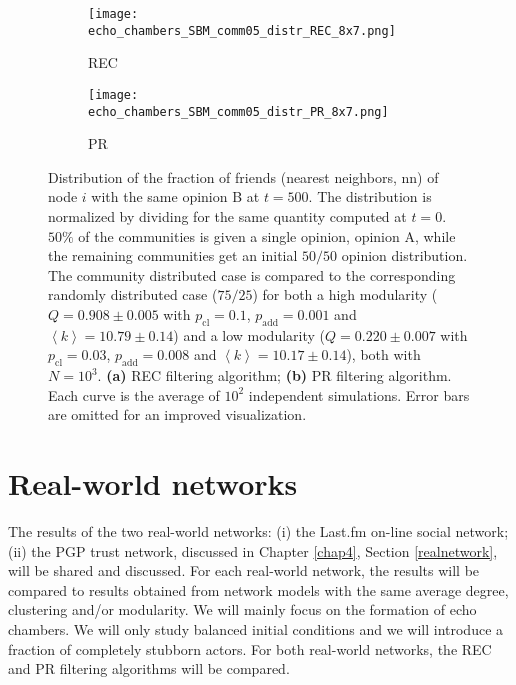 \documentclass[11 pt , letterpaper , twoside , openright]{book}
\begin{document}
\begin{figure}[H]
  \begin{subfigure}[b]{0.49\textwidth}
    \caption{REC}
  	\texttt{[image: echo\_chambers\_SBM\_comm05\_distr\_REC\_8x7.png]}
    \label{rec_comm05_echo}
  \end{subfigure}
  \begin{subfigure}[b]{0.49\textwidth}
    \caption{PR}
  	\texttt{[image: echo\_chambers\_SBM\_comm05\_distr\_PR\_8x7.png]}
    \label{pr_comm05_echo}
  \end{subfigure}
  \captionsetup{format=plain}
  \caption[Distribution of the fraction of friends (nearest neighbors, nn) of node $i$ with the same opinion B at $t = 500$. $50 \%$ of the communities is given a single opinion, opinion A, while the remaining communities get an initial $50/50$ opinion distribution. The community distributed case is compared to the corresponding randomly distributed case ($75/25$) for both a high modularity and a low modularity network. Results for the REC and PR filtering algorithms.]{Distribution of the fraction of friends (nearest neighbors, nn) of node $i$ with the same opinion B at $t = 500$. The distribution is normalized by dividing for the same quantity computed at $t=0$. $50 \%$ of the communities is given a single opinion, opinion A, while the remaining communities get an initial $50/50$ opinion distribution. The community distributed case is compared to the corresponding randomly distributed case ($75/25$) for both a high modularity ($Q = 0.908 \pm 0.005$ with $p_{\text{cl}} = 0.1$, $p_{\text{add}} = 0.001$ and $\left<k\right> = 10.79 \pm 0.14$) and a low modularity ($Q = 0.220 \pm 0.007$ with $p_{\text{cl}} = 0.03$, $p_{\text{add}} = 0.008$ and $\left<k\right> = 10.17 \pm 0.14$), both with $N=10^3$. \textbf{(a)} REC filtering algorithm; \textbf{(b)} PR filtering algorithm. Each curve is the average of $10^2$ independent simulations. Error bars are omitted for an improved visualization.}
\label{echo_05_commOp0_other_50-50}
\end{figure}

\newpage
\section{Real-world networks}

The results of the two real-world networks: (i) the Last.fm on-line social network; (ii) the PGP trust network, discussed in Chapter \ref{chap4}, Section \ref{realnetwork}, will be shared and discussed. For each real-world network, the results will be compared to results obtained from network models with the same average degree, clustering and/or modularity. We will mainly focus on the formation of echo chambers. We will only study balanced initial conditions and we will introduce a fraction of completely stubborn actors. For both real-world networks, the REC and PR filtering algorithms will be compared.
\end{document}
